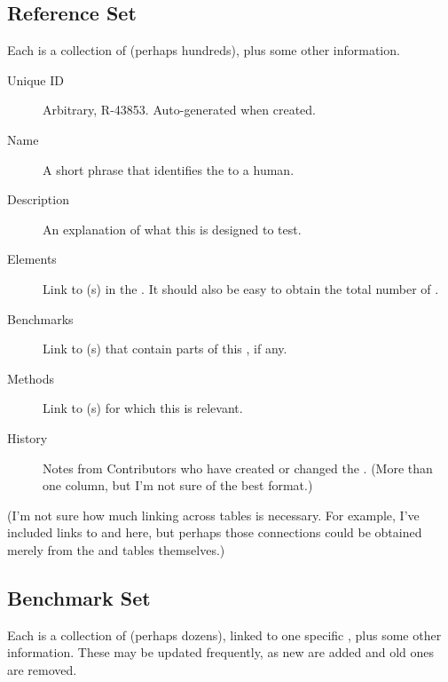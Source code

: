 \subsection{Reference Set}
\label{sec:tables_refset}

Each \Refset is a collection of \Elements (perhaps hundreds), plus some other information.

\begin{description}
    \item[Unique ID] Arbitrary, \eg R-43853.  Auto-generated when created.
    \item[Name] A short phrase that identifies the \Refset to a human.
    \item[Description] An explanation of what this \Refset is designed to test.
    \item[Elements] Link to \Element(s) in the \Refset.  It should also be easy to obtain the total number of \Elements.
    \item[Benchmarks] Link to \Benchmark(s) that contain parts of this \Refset, if any.
    \item[Methods] Link to \Method(s) for which this \Refset is relevant.
    \item[History] Notes from Contributors who have created or changed the \Refset.  (More than one column, but I'm not sure of the best format.)
\end{description}

(I'm not sure how much linking across tables is necessary.
For example, I've included links to \Benchmark and \Method here, but perhaps those connections could be obtained merely from the \Benchmark and \Method tables themselves.)

\subsection{Benchmark Set}
\label{sec:tables_benchmark}

Each \Benchmark is a collection of \Elements (perhaps dozens), linked to one specific \Task, plus some other information.
These may be updated frequently, as new \Elements are added and old ones are removed.

